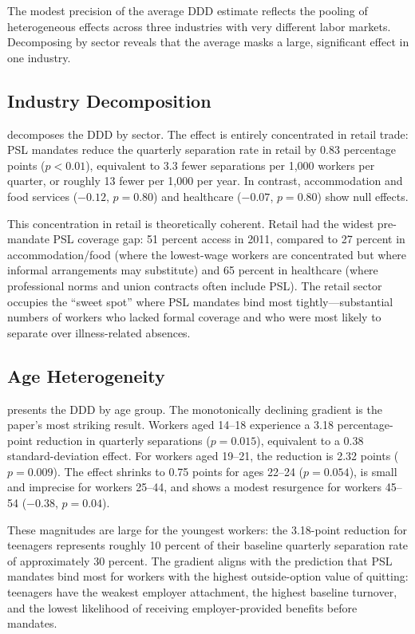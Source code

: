 \documentclass[12pt]{article}
\begin{document}
The modest precision of the average DDD estimate reflects the pooling of heterogeneous effects across three industries with very different labor markets. Decomposing by sector reveals that the average masks a large, significant effect in one industry.

\subsection{Industry Decomposition}



 decomposes the DDD by sector. The effect is entirely concentrated in retail trade: PSL mandates reduce the quarterly separation rate in retail by 0.83 percentage points ($p < 0.01$), equivalent to 3.3 fewer separations per 1,000 workers per quarter, or roughly 13 fewer per 1,000 per year. In contrast, accommodation and food services ($-0.12$, $p = 0.80$) and healthcare ($-0.07$, $p = 0.80$) show null effects.

This concentration in retail is theoretically coherent. Retail had the widest pre-mandate PSL coverage gap: 51 percent access in 2011, compared to 27 percent in accommodation/food (where the lowest-wage workers are concentrated but where informal arrangements may substitute) and 65 percent in healthcare (where professional norms and union contracts often include PSL). The retail sector occupies the ``sweet spot'' where PSL mandates bind most tightly---substantial numbers of workers who lacked formal coverage and who were most likely to separate over illness-related absences.

\subsection{Age Heterogeneity}



 presents the DDD by age group. The monotonically declining gradient is the paper's most striking result. Workers aged 14--18 experience a 3.18 percentage-point reduction in quarterly separations ($p = 0.015$), equivalent to a 0.38 standard-deviation effect. For workers aged 19--21, the reduction is 2.32 points ($p = 0.009$). The effect shrinks to 0.75 points for ages 22--24 ($p = 0.054$), is small and imprecise for workers 25--44, and shows a modest resurgence for workers 45--54 ($-0.38$, $p = 0.04$).

These magnitudes are large for the youngest workers: the 3.18-point reduction for teenagers represents roughly 10 percent of their baseline quarterly separation rate of approximately 30 percent. The gradient aligns with the prediction that PSL mandates bind most for workers with the highest outside-option value of quitting: teenagers have the weakest employer attachment, the highest baseline turnover, and the lowest likelihood of receiving employer-provided benefits before mandates.
\end{document}
